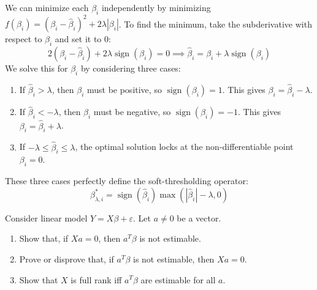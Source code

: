 \begin{solution}
We can minimize each $\beta_i$ independently by minimizing $f(\beta_i) = (\beta_i - \hat{\beta}_i)^2 + 2\lambda |\beta_i|$.
To find the minimum, take the subderivative with respect to $\beta_i$ and set it to 0:
\[ 2(\beta_i - \hat{\beta}_i) + 2\lambda \operatorname{sign}(\beta_i) = 0 \implies \hat{\beta}_i = \beta_i + \lambda \operatorname{sign}(\beta_i) \]
We solve this for $\beta_i$ by considering three cases:
\begin{enumerate}
    \item If $\hat{\beta}_i > \lambda$, then $\beta_i$ must be positive, so $\operatorname{sign}(\beta_i) = 1$. This gives $\beta_i = \hat{\beta}_i - \lambda$.
    \item If $\hat{\beta}_i < -\lambda$, then $\beta_i$ must be negative, so $\operatorname{sign}(\beta_i) = -1$. This gives $\beta_i = \hat{\beta}_i + \lambda$.
    \item If $-\lambda \leq \hat{\beta}_i \leq \lambda$, the optimal solution locks at the non-differentiable point $\beta_i = 0$.
\end{enumerate}
These three cases perfectly define the soft-thresholding operator:
\[ \beta_{\lambda,i}^* = \operatorname{sign}(\hat{\beta}_i) \max(|\hat{\beta}_i| - \lambda, 0) \]
\end{solution}

\begin{exercise}
\label{probability:2013:12}
Consider linear model $Y = X\beta + \varepsilon$. Let $a \neq 0$ be a vector.
\begin{enumerate}
    \item Show that, if $Xa = 0$, then $a^T \beta$ is not estimable.
    \item Prove or disprove that, if $a^T \beta$ is not estimable, then $Xa = 0$.
    \item Show that $X$ is full rank iff $a^T \beta$ are estimable for all $a$.
\end{enumerate}
\end{exercise}

